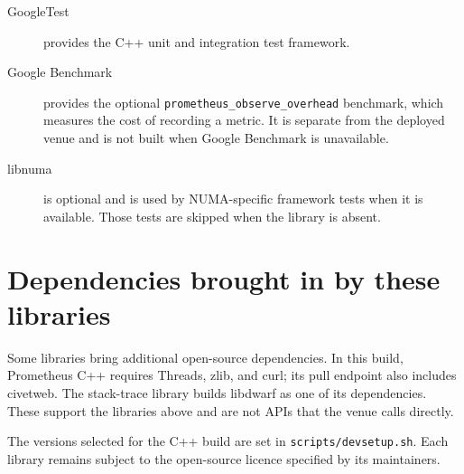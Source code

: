 \begin{description}
  \item[GoogleTest] provides the C++ unit and integration test framework.
  \item[Google Benchmark] provides the optional
    \texttt{prometheus\_observe\_overhead} benchmark, which measures the cost
    of recording a metric. It is separate from the deployed venue and is not
    built when Google Benchmark is unavailable.
  \item[libnuma] is optional and is used by NUMA-specific framework tests
    when it is available. Those tests are skipped when the library is absent.
\end{description}

\section{Dependencies brought in by these libraries}
\label{sec:third_party_libraries_transitive}

Some libraries bring additional open-source dependencies. In this build,
Prometheus C++ requires Threads, zlib, and curl; its pull endpoint also
includes civetweb. The stack-trace library builds libdwarf as one of its
dependencies. These support the libraries above and are not APIs that the
venue calls directly.

The versions selected for the C++ build are set in
\texttt{scripts/devsetup.sh}. Each library remains subject to the open-source
licence specified by its maintainers.
